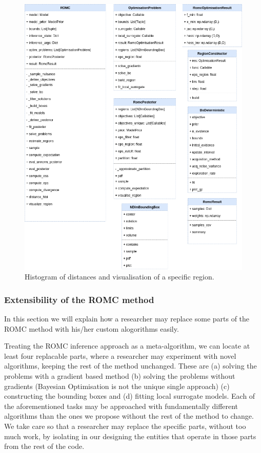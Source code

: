 \begin{figure}[h]
    \begin{center}
      \includegraphics[width=\textwidth]{./Thesis/graphs/RomcEntityDiagram.png}
    \end{center}
  \caption{Histogram of distances and visualisation of a specific region.}
  \label{fig:example_training}
\end{figure}


\subsubsection{Extensibility of the ROMC method}

In this section we will explain how a researcher may replace some
parts of the ROMC method with his/her custom alogorithms easily.

Treating the ROMC inference approach as a meta-algorithm, we can
locate at least four replacable parts, where a researcher may
experiment with novel algorithms, keeping the rest of the method
unchanged. These are (a) solving the problems with a gradient based
method (b) solving the problems without gradients (Bayesian
Optimisation is not the unique single approach) (c) constructing the
bounding boxes and (d) fitting local surrogate models. Each of the
aforementioned tasks may be approached with fundamentally different
algorithms than the ones we propose without the rest of the method to
change. We take care so that a researcher may replace the specific
parts, without too much work, by isolating in our designing the
entities that operate in those parts from the rest of the code.


